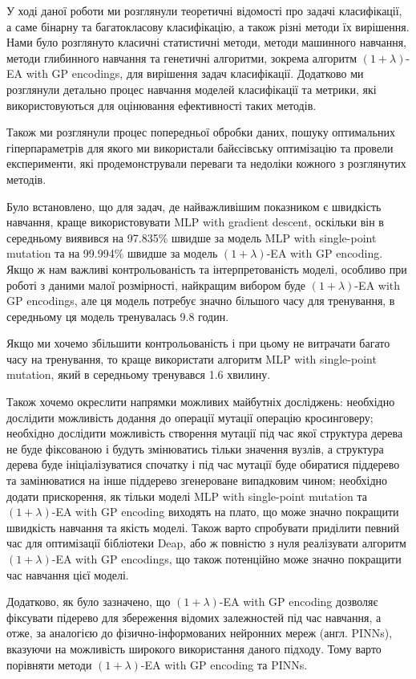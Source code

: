 У ході даної роботи ми розглянули теоретичні відомості про задачі класифікації, а саме бінарну та багатокласову класифікацію, а також різні методи їх вирішення. Нами було розглянуто класичні статистичні методи, методи машинного навчання, методи глибинного навчання та генетичні алгоритми, зокрема алгоритм $(1+\lambda)$-EA with GP encodings, для вирішення задач класифікації. Додатково ми розглянули детально процес навчання моделей класифікації та метрики, які використовуються для оцінювання ефективності таких методів.

Також ми розглянули процес попередньої обробки даних, пошуку оптимальних гіперпараметрів для якого ми використали байєсівську оптимізацію та провели експерименти, які продемонстрували переваги та недоліки кожного з розглянутих методів. 

Було встановлено, що для задач, де найважливішим показником є швидкість навчання, краще використовувати MLP with gradient descent, оскільки він в середньому виявився на 97.835\% швидше за модель MLP with single-point mutation та на 99.994\% швидше за модель $(1+\lambda)$-EA with GP encoding. Якщо ж нам важливі контрольованість та інтерпретованість моделі, особливо при роботі з даними малої розмірності, найкращим вибором буде $(1+\lambda)$-EA with GP encodings, але ця модель потребує значно більшого часу для тренування, в середньому ця модель тренувалась 9.8 годин. 

Якщо ми хочемо збільшити контрольованість і при цьому не витрачати багато часу на тренування, то краще використати алгоритм MLP with single-point mutation, який в середньому тренувався 1.6 хвилину.

Також хочемо окреслити напрямки можливих майбутніх досліджень: необхідно дослідити можливість додання до операції мутації операцію кросинговеру; необхідно дослідити можливість створення мутації під час якої структура дерева не буде фіксованою і будуть змінюватись тільки значення вузлів, а структура дерева буде ініціалізуватися спочатку і під час мутації буде обиратися піддерево та замінюватися на інше піддерево згенероване випадковим чином; необхідно додати прискорення, як тільки моделі MLP with single-point mutation та $(1+\lambda)$-EA with GP encoding виходять на плато, що може значно покращити швидкість навчання та якість моделі. Також варто спробувати приділити певний час для оптимізації бібліотеки Deap, або ж повністю з нуля реалізувати алгоритм $(1+\lambda)$-EA with GP encodings, що також потенційно може значно покращити час навчання цієї моделі.

Додатково, як було зазначено, що $(1+\lambda)$-EA with GP encoding дозволяє фіксувати підерево для збереження відомих залежностей під час навчання, а отже, за аналогією до фізично-інформованих нейронних мереж (англ. PINNs), вказуючи на можливість широкого використання даного підходу.  Тому варто порівняти методи $(1+\lambda)$-EA with GP encoding та PINNs.
